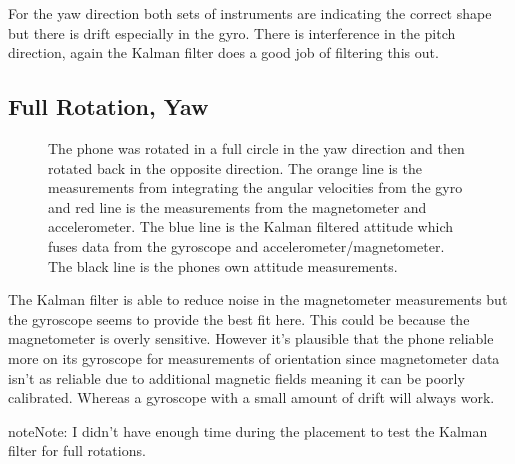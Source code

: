 \documentclass[letterpaper,10pt,english]{jupyterBook}
\begin{document}
\sphinxAtStartPar
For the yaw direction both sets of instruments are indicating the correct shape but there is drift especially in the gyro. There is interference in the pitch direction, again the Kalman filter does a good job of filtering this out.


\subsection{Full Rotation, Yaw}
\label{\detokenize{7RealData:full-rotation-yaw}}
\begin{figure}[htbp]
\centering
\capstart

\noindent{}
\caption{The phone was rotated in a full circle in the yaw direction and then rotated back in the opposite direction. The orange line is the measurements from integrating the angular velocities from the gyro and red line is the measurements from the magnetometer and accelerometer. The blue line is the Kalman filtered attitude which fuses data from the gyroscope and accelerometer/magnetometer.  The black line is the phones own attitude measurements.}\label{\detokenize{7RealData:fig-full-yaw}}\end{figure}

\sphinxAtStartPar
The Kalman filter is able to reduce noise in the magnetometer measurements but the gyroscope seems to provide the best fit here. This could be because the magnetometer is overly sensitive. However it’s plausible that the phone reliable more on its gyroscope for measurements of orientation since magnetometer data isn’t as reliable due to additional magnetic fields meaning it can be poorly calibrated. Whereas a gyroscope with a small amount of drift will always work.

\begin{sphinxadmonition}{note}{Note:}
\sphinxAtStartPar
I didn’t have enough time during the placement to test the Kalman filter for full rotations.
\end{sphinxadmonition}

\sphinxstepscope
\end{document}
